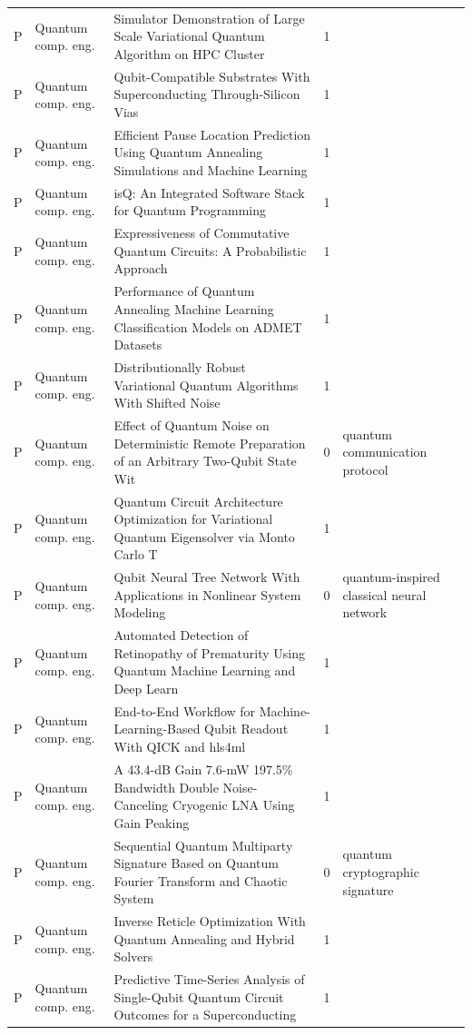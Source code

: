 \documentclass[10pt]{article}
\begin{document}
\begin{longtable}{@{}llL{8.6cm}lL{4.2cm}@{}}
P & Quantum comp. eng. & Simulator Demonstration of Large Scale Variational Quantum Algorithm on HPC Cluster & 1 &  \\
P & Quantum comp. eng. & Qubit-Compatible Substrates With Superconducting Through-Silicon Vias & 1 &  \\
P & Quantum comp. eng. & Efficient Pause Location Prediction Using Quantum Annealing Simulations and Machine Learning & 1 &  \\
P & Quantum comp. eng. & isQ: An Integrated Software Stack for Quantum Programming & 1 &  \\
P & Quantum comp. eng. & Expressiveness of Commutative Quantum Circuits: A Probabilistic Approach & 1 &  \\
P & Quantum comp. eng. & Performance of Quantum Annealing Machine Learning Classification Models on ADMET Datasets & 1 &  \\
P & Quantum comp. eng. & Distributionally Robust Variational Quantum Algorithms With Shifted Noise & 1 &  \\
P & Quantum comp. eng. & Effect of Quantum Noise on Deterministic Remote Preparation of an Arbitrary Two-Qubit State Wit & 0 & quantum communication protocol \\
P & Quantum comp. eng. & Quantum Circuit Architecture Optimization for Variational Quantum Eigensolver via Monto Carlo T & 1 &  \\
P & Quantum comp. eng. & Qubit Neural Tree Network With Applications in Nonlinear System Modeling & 0 & quantum-inspired classical neural network \\
P & Quantum comp. eng. & Automated Detection of Retinopathy of Prematurity Using Quantum Machine Learning and Deep Learn & 1 &  \\
P & Quantum comp. eng. & End-to-End Workflow for Machine-Learning-Based Qubit Readout With QICK and hls4ml & 1 &  \\
P & Quantum comp. eng. & A 43.4-dB Gain 7.6-mW 197.5\% Bandwidth Double Noise-Canceling Cryogenic LNA Using Gain Peaking  & 1 &  \\
P & Quantum comp. eng. & Sequential Quantum Multiparty Signature Based on Quantum Fourier Transform and Chaotic System & 0 & quantum cryptographic signature \\
P & Quantum comp. eng. & Inverse Reticle Optimization With Quantum Annealing and Hybrid Solvers & 1 &  \\
P & Quantum comp. eng. & Predictive Time-Series Analysis of Single-Qubit Quantum Circuit Outcomes for a Superconducting  & 1 &  \\

\end{longtable}
\end{document}
